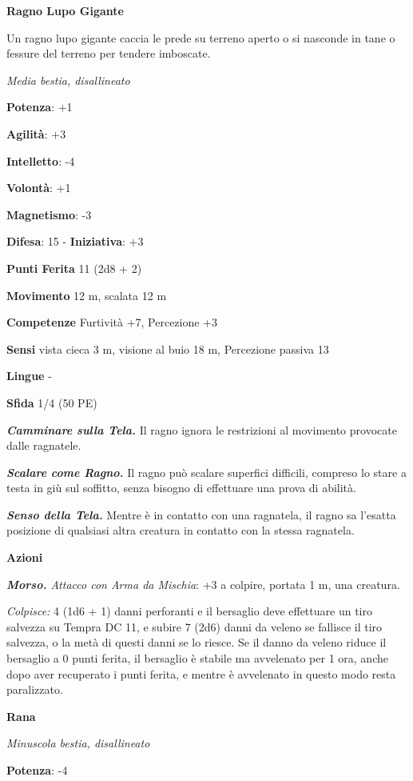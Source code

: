 \begin{multicols}{2}
\textbf{Ragno Lupo Gigante}

Un ragno lupo gigante caccia le prede su terreno aperto o si nasconde in
tane o fessure del terreno per tendere imboscate.

\emph{Media bestia, disallineato}

\textbf{Potenza}: +1

\textbf{Agilità}: +3

\textbf{Intelletto}: -4

\textbf{Volontà}: +1

\textbf{Magnetismo}: -3

\textbf{Difesa}: 15 - \textbf{Iniziativa}: +3

\textbf{Punti Ferita} 11 (2d8 + 2)

\textbf{Movimento} 12 m, scalata 12 m

\textbf{Competenze} Furtività +7, Percezione +3

\textbf{Sensi} vista cieca 3 m, visione al buio 18 m, Percezione passiva
13

\textbf{Lingue} -

\textbf{Sfida} 1/4 (50 PE)\smallskip

\emph{\textbf{Camminare sulla Tela.}} Il ragno ignora le restrizioni al
movimento provocate dalle ragnatele.

\emph{\textbf{Scalare come Ragno.}} Il ragno può scalare superfici
difficili, compreso lo stare a testa in giù sul soffitto, senza bisogno
di effettuare una prova di abilità.

\emph{\textbf{Senso della Tela.}} Mentre è in contatto con una
ragnatela, il ragno sa l'esatta posizione di qualsiasi altra creatura in
contatto con la stessa ragnatela.

\smallskip\textbf{Azioni}

\emph{\textbf{Morso.} Attacco con Arma da Mischia}: +3 a colpire,
portata 1 m, una creatura.

\emph{Colpisce:} 4 (1d6 + 1) danni perforanti e il bersaglio deve
effettuare un tiro salvezza su Tempra DC 11, e subire 7 (2d6)
danni da veleno se fallisce il tiro salvezza, o la metà di questi danni
se lo riesce. Se il danno da veleno riduce il bersaglio a 0 punti
ferita, il bersaglio è stabile ma avvelenato per 1 ora, anche dopo aver
recuperato i punti ferita, e mentre è avvelenato in questo modo resta
paralizzato.

\textbf{Rana}

\emph{Minuscola bestia, disallineato}

\textbf{Potenza}: -4


\end{multicols}
